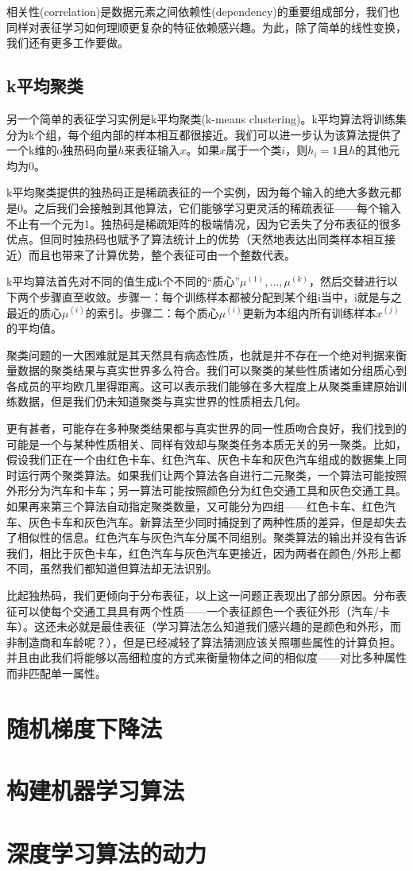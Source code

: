 相关性(correlation)是数据元素之间依赖性(dependency)的重要组成部分，我们也同样对表征学习如何理顺更复杂的特征依赖感兴趣。为此，除了简单的线性变换，我们还有更多工作要做。

\subsection{k平均聚类}
\label{sec:5.8.2}

另一个简单的表征学习实例是k平均聚类(k-means clustering)。k平均算法将训练集分为k个组，每个组内部的样本相互都很接近。我们可以进一步认为该算法提供了一个k维的o独热码向量$h$来表征输入$x$。如果$x$属于一个类$i$，则$h_i=1$且$h$的其他元均为0。

k平均聚类提供的独热码正是稀疏表征的一个实例，因为每个输入的绝大多数元都是0。之后我们会接触到其他算法，它们能够学习更灵活的稀疏表征——每个输入不止有一个元为1。独热码是稀疏矩阵的极端情况，因为它丢失了分布表征的很多优点。但同时独热码也赋予了算法统计上的优势（天然地表达出同类样本相互接近）而且也带来了计算优势，整个表征可由一个整数代表。

k平均算法首先对不同的值生成k个不同的“质心”${\mu^{(1)},...,\mu^{(k)}}$，然后交替进行以下两个步骤直至收敛。步骤一：每个训练样本都被分配到某个组i当中，i就是与之最近的质心$\mu^{(i)}$的索引。步骤二：每个质心$\mu^{(i)}$更新为本组内所有训练样本$x^{(j)}$的平均值。

聚类问题的一大困难就是其天然具有病态性质，也就是并不存在一个绝对判据来衡量数据的聚类结果与真实世界多么符合。我们可以聚类的某些性质诸如分组质心到各成员的平均欧几里得距离。这可以表示我们能够在多大程度上从聚类重建原始训练数据，但是我们仍未知道聚类与真实世界的性质相去几何。

更有甚者，可能存在多种聚类结果都与真实世界的同一性质吻合良好，我们找到的可能是一个与某种性质相关、同样有效却与聚类任务本质无关的另一聚类。比如，假设我们正在一个由红色卡车、红色汽车、灰色卡车和灰色汽车组成的数据集上同时运行两个聚类算法。如果我们让两个算法各自进行二元聚类，一个算法可能按照外形分为汽车和卡车；另一算法可能按照颜色分为红色交通工具和灰色交通工具。如果再来第三个算法自动指定聚类数量，又可能分为四组——红色卡车、红色汽车、灰色卡车和灰色汽车。新算法至少同时捕捉到了两种性质的差异，但是却失去了相似性的信息。红色汽车与灰色汽车分属不同组别。聚类算法的输出并没有告诉我们，相比于灰色卡车，红色汽车与灰色汽车更接近，因为两者在颜色/外形上都不同，虽然我们都知道但算法却无法识别。

比起独热码，我们更倾向于分布表征，以上这一问题正表现出了部分原因。分布表征可以使每个交通工具具有两个性质——一个表征颜色一个表征外形（汽车/卡车）。这还未必就是最佳表征（学习算法怎么知道我们感兴趣的是颜色和外形，而非制造商和车龄呢？），但是已经减轻了算法猜测应该关照哪些属性的计算负担。并且由此我们将能够以高细粒度的方式来衡量物体之间的相似度——对比多种属性而非匹配单一属性。

\section{随机梯度下降法}
\label{sec:5.9}

\section{构建机器学习算法}
\label{sec:5.10}

\section{深度学习算法的动力}
\label{sec:5.11}